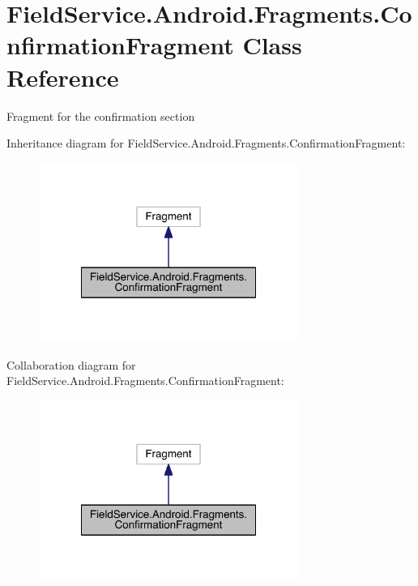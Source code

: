 \hypertarget{class_field_service_1_1_android_1_1_fragments_1_1_confirmation_fragment}{\section{Field\+Service.\+Android.\+Fragments.\+Confirmation\+Fragment Class Reference}
\label{class_field_service_1_1_android_1_1_fragments_1_1_confirmation_fragment}
}


Fragment for the confirmation section  




Inheritance diagram for Field\+Service.\+Android.\+Fragments.\+Confirmation\+Fragment\+:
\nopagebreak
\begin{figure}[H]
\begin{center}
\leavevmode
\includegraphics[width=240pt]{class_field_service_1_1_android_1_1_fragments_1_1_confirmation_fragment__inherit__graph}
\end{center}
\end{figure}


Collaboration diagram for Field\+Service.\+Android.\+Fragments.\+Confirmation\+Fragment\+:
\nopagebreak
\begin{figure}[H]
\begin{center}
\leavevmode
\includegraphics[width=240pt]{class_field_service_1_1_android_1_1_fragments_1_1_confirmation_fragment__coll__graph}
\end{center}
\end{figure}
